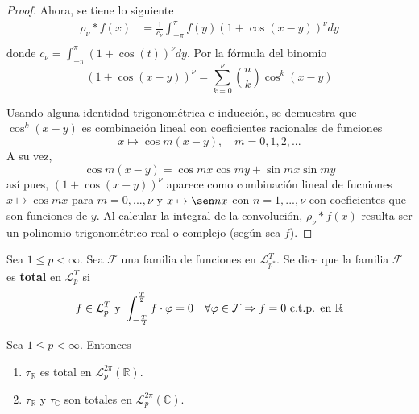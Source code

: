 \documentclass[12pt]{report}
\theoremstyle{largebreak}
\begin{document}
\begin{proof}
        Ahora, se tiene lo siguiente
        \begin{equation*}
            \begin{split}
                \rho_\nu*f(x)&=\frac{1}{c_\nu}\int_{-\pi}^\pi f(y)\left(1+\cos(x-y)\right)^\nu dy\\
            \end{split}
        \end{equation*}
        donde $c_\nu=\int_{-\pi}^\pi(1+\cos(t))^\nu dy$. Por la fórmula del binomio
        \begin{equation*}
            \left(1+\cos(x-y)\right)^\nu=\sum_{k=0}^\nu\binom{n}{k}\cos^k(x-y)
        \end{equation*}

        Usando alguna identidad trigonométrica e inducción, se demuestra que $\cos^k(x-y)$ es combinación lineal con coeficientes racionales de funciones
        \begin{equation*}
            x\mapsto \cos m(x-y),\quad m=0,1,2,...
        \end{equation*}
        A su vez,
        \begin{equation*}
            \cos m(x-y)=\cos mx\cos my+\sin mx\sin my
        \end{equation*}
        así pues, $(1+\cos (x-y))^\nu$ aparece como combinación lineal de fucniones $x\mapsto\cos mx$ para $m=0,...,\nu$ y $x\mapsto\sen nx$ con $n=1,...,\nu$ con coeficientes que son funciones de $y$. Al calcular la integral de la convolución, $\rho_\nu*f(x)$ resulta ser un polinomio trigonométrico real o complejo (según sea $f$).
    \end{proof}

    \begin{mydef}
        Sea $1\leq p<\infty$. Sea $\mathcal{F}$ una familia de funciones en $\mathcal{L}_{ p^*}^T$. Se dice que la familia $\mathcal{F}$ es \textbf{total} en $\mathcal{L}_{p}^T$ si
        \begin{equation*}
            f\in\mathcal{L}_p^T \textup{ y }\int_{-\frac{T}{2}}^{\frac{T}{2}}f\cdot\varphi=0\quad\forall\varphi\in\mathcal{F} \Rightarrow f=0\textup{ c.t.p. en }\mathbb{R}
        \end{equation*}
    \end{mydef}

    \begin{theor}
        Sea $1\leq p<\infty$. Entonces
        \begin{enumerate}
            \item $\tau_{\mathbb{R}}$ es total en $\mathcal{L}_p^{2\pi}(\mathbb{R})$.
            \item $\tau_{\mathbb{R}}$ y $\tau_\mathbb{C}$ son totales en $\mathcal{L}_p^{2\pi}(\mathbb{C})$.
        \end{enumerate}
    \end{theor}
\end{document}
